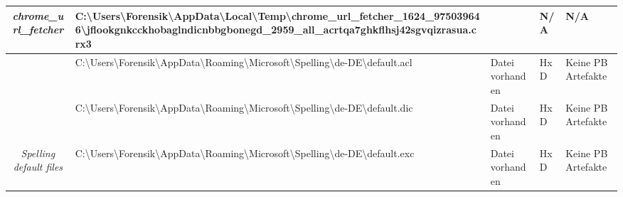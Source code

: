 \begin{appendices}
{\begin{landscape}
\begin{table}[h!]
{\begin{tabular}{cllll}
		\multicolumn{1}{|c|}{\multirow{-6}{*}{\textit{chrome\_url\_fetcher}}}    & \multicolumn{1}{l|}{\cellcolor[HTML]{FE0000}C:\textbackslash{}Users\textbackslash{}Forensik\textbackslash{}AppData\textbackslash{}Local\textbackslash{}Temp\textbackslash{}chrome\_url\_fetcher\_1624\_975039646\textbackslash{}jflookgnkcckhobaglndicnbbgbonegd\_2959\_all\_acrtqa7ghkflhsj42sgvqizrasua.crx3}                          & \multicolumn{1}{l|}{\cellcolor[HTML]{963400}{\color[HTML]{FFFFFF} Datei nicht wiederherstellbar}}   & \multicolumn{1}{l|}{\cellcolor[HTML]{C0C0C0}N/A}           & \multicolumn{1}{l|}{\cellcolor[HTML]{C0C0C0}N/A}                \\ \hline
		\multicolumn{1}{|c|}{}                                                   & \multicolumn{1}{l|}{\cellcolor[HTML]{FE0000}C:\textbackslash{}Users\textbackslash{}Forensik\textbackslash{}AppData\textbackslash{}Roaming\textbackslash{}Microsoft\textbackslash{}Spelling\textbackslash{}de-DE\textbackslash{}default.acl}                                                                                              & \multicolumn{1}{l|}{\cellcolor[HTML]{009901}Datei vorhanden}                                        & \multicolumn{1}{l|}{HxD}                                   & \multicolumn{1}{l|}{\cellcolor[HTML]{F8A102}Keine PB Artefakte} \\ \cline{2-5} 
		\multicolumn{1}{|c|}{}                                                   & \multicolumn{1}{l|}{\cellcolor[HTML]{FE0000}C:\textbackslash{}Users\textbackslash{}Forensik\textbackslash{}AppData\textbackslash{}Roaming\textbackslash{}Microsoft\textbackslash{}Spelling\textbackslash{}de-DE\textbackslash{}default.dic}                                                                                              & \multicolumn{1}{l|}{\cellcolor[HTML]{009901}Datei vorhanden}                                        & \multicolumn{1}{l|}{HxD}                                   & \multicolumn{1}{l|}{\cellcolor[HTML]{F8A102}Keine PB Artefakte} \\ \cline{2-5} 
		\multicolumn{1}{|c|}{\multirow{-3}{*}{\textit{Spelling default files}}}  & \multicolumn{1}{l|}{\cellcolor[HTML]{FE0000}C:\textbackslash{}Users\textbackslash{}Forensik\textbackslash{}AppData\textbackslash{}Roaming\textbackslash{}Microsoft\textbackslash{}Spelling\textbackslash{}de-DE\textbackslash{}default.exc}                                                                                              & \multicolumn{1}{l|}{\cellcolor[HTML]{009901}Datei vorhanden}                                        & \multicolumn{1}{l|}{HxD}                                   & \multicolumn{1}{l|}{\cellcolor[HTML]{F8A102}Keine PB Artefakte} \\ \hline

\end{tabular}}
\end{table}
\end{landscape}}
\end{appendices}
